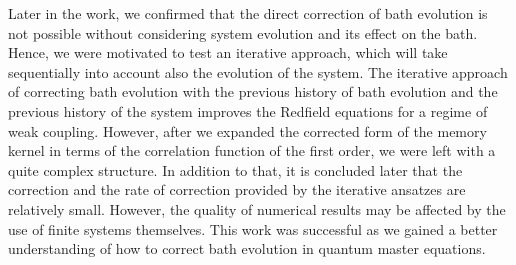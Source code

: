 Later in the work, we confirmed that the direct correction of bath evolution is not possible without considering system evolution and its effect on the bath. Hence, we were motivated to test an iterative approach, which will take sequentially into account also the evolution of the system. 
The iterative approach of correcting bath evolution with the previous history of bath evolution and the previous history of the system improves the Redfield equations for a regime of weak coupling. However, after we expanded the corrected form of the memory kernel in terms of the correlation function of the first order, we were left with a quite complex structure. In addition to that, it is concluded later that the correction and the rate of correction provided by the iterative ansatzes are relatively small. However, the quality of numerical results may be affected by the use of finite systems themselves. 
This work was successful as we gained a better understanding of how to correct bath evolution in quantum master equations. 

